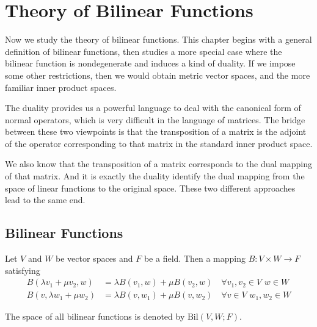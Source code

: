 \chapter{Theory of Bilinear Functions}

Now we study the theory of bilinear functions. This chapter begins with a general definition of bilinear functions, then studies a more special case where the bilinear function is nondegenerate and induces a kind of duality. If we impose some other restrictions, then we would obtain metric vector spaces, and the more familiar inner product spaces.\par
The duality provides us a powerful language to deal with the canonical form of normal operators, which is very difficult in the language of matrices. The bridge between these two viewpoints is that the transposition of a matrix is the adjoint of the operator corresponding to that matrix in the standard inner product space.\par
We also know that the transposition of a matrix corresponds to the dual mapping of that matrix. And it is exactly the duality identify the dual mapping from the space of linear functions to the original space. These two different approaches lead to the same end.
\section{Bilinear Functions}
\begin{definition}
Let $V$ and $W$ be vector spaces and $F$ be a field. Then a mapping $B:V\times W\to F$ satisfying 
\begin{align*}
B(\lambda v_1+\mu v_2,w)&=\lambda B(v_1,w)+\mu B(v_2,w)\quad \forall v_1,v_2\in V\,\,w\in W\\
B(v,\lambda w_1+\mu w_2)&=\lambda B(v,w_1)+\mu B(v,w_2)\quad \forall v\in V\,\,w_1,w_2\in W
\end{align*}
\end{definition}
\begin{remark}
The space of all bilinear functions is denoted by $\text{Bil}(V,W;F)$.
\end{remark}

